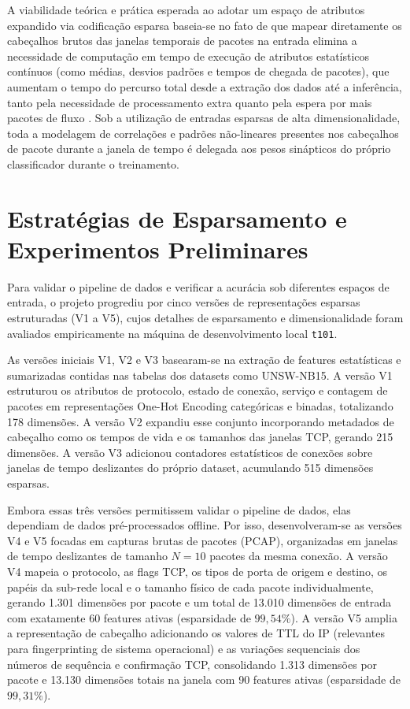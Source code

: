 \documentclass[11pt,a4paper,oneside]{article}
\begin{document}
A viabilidade teórica e prática esperada ao adotar um espaço de atributos expandido via codificação esparsa baseia-se no fato de que mapear diretamente os cabeçalhos brutos das janelas temporais de pacotes na entrada elimina a necessidade de computação em tempo de execução de atributos estatísticos contínuos (como médias, desvios padrões e tempos de chegada de pacotes), que aumentam o tempo do percurso total desde a extração dos dados até a inferência, tanto pela necessidade de processamento extra quanto pela espera por mais pacotes de fluxo \cite{ghadermazi2024towards}. Sob a utilização de entradas esparsas de alta dimensionalidade, toda a modelagem de correlações e padrões não-lineares presentes nos cabeçalhos de pacote durante a janela de tempo é delegada aos pesos sinápticos do próprio classificador durante o treinamento.

\section{Estratégias de Esparsamento e Experimentos Preliminares}
Para validar o pipeline de dados e verificar a acurácia sob diferentes espaços de entrada, o projeto progrediu por cinco versões de representações esparsas estruturadas (V1 a V5), cujos detalhes de esparsamento e dimensionalidade foram avaliados empiricamente na máquina de desenvolvimento local \texttt{t101}.

As versões iniciais V1, V2 e V3 basearam-se na extração de features estatísticas e sumarizadas contidas nas tabelas dos datasets como UNSW-NB15. A versão V1 estruturou os atributos de protocolo, estado de conexão, serviço e contagem de pacotes em representações One-Hot Encoding categóricas e binadas, totalizando 178 dimensões. A versão V2 expandiu esse conjunto incorporando metadados de cabeçalho como os tempos de vida e os tamanhos das janelas TCP, gerando 215 dimensões. A versão V3 adicionou contadores estatísticos de conexões sobre janelas de tempo deslizantes do próprio dataset, acumulando 515 dimensões esparsas. 

Embora essas três versões permitissem validar o pipeline de dados, elas dependiam de dados pré-processados offline. Por isso, desenvolveram-se as versões V4 e V5 focadas em capturas brutas de pacotes (PCAP), organizadas em janelas de tempo deslizantes de tamanho $N=10$ pacotes da mesma conexão. A versão V4 mapeia o protocolo, as flags TCP, os tipos de porta de origem e destino, os papéis da sub-rede local e o tamanho físico de cada pacote individualmente, gerando 1.301 dimensões por pacote e um total de 13.010 dimensões de entrada com exatamente 60 features ativas (esparsidade de $99,54\%$). A versão V5 amplia a representação de cabeçalho adicionando os valores de TTL do IP (relevantes para fingerprinting de sistema operacional) e as variações sequenciais dos números de sequência e confirmação TCP, consolidando 1.313 dimensões por pacote e 13.130 dimensões totais na janela com 90 features ativas (esparsidade de $99,31\%$).
\end{document}
